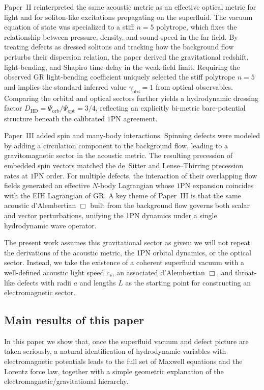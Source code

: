 \documentclass[11pt]{article}
\begin{document}
Paper~II \cite{Norris:Paper2} reinterpreted the same acoustic metric as an effective optical metric for light and for soliton-like excitations propagating on the superfluid.  The vacuum equation of state was specialized to a stiff $n=5$ polytrope, which fixes the relationship between pressure, density, and sound speed in the far field.  By treating defects as dressed solitons and tracking how the background flow perturbs their dispersion relation, the paper derived the gravitational redshift, light-bending, and Shapiro time delay in the weak-field limit.  Requiring the observed GR light-bending coefficient uniquely selected the stiff polytrope $n=5$ and implies the standard inferred value $\gamma_{\mathrm{obs}}=1$ from optical observables.  Comparing the orbital and optical sectors further yields a hydrodynamic dressing factor $D_{\mathrm{HD}}=\Psi_{\mathrm{orb}}/\Psi_{\mathrm{opt}}=3/4$, reflecting an explicitly bi-metric bare-potential structure beneath the calibrated $1$PN agreement.

Paper~III \cite{Norris:Paper3} added spin and many-body interactions.  Spinning defects were modeled by adding a circulation component to the background flow, leading to a gravitomagnetic sector in the acoustic metric.  The resulting precession of embedded spin vectors matched the de~Sitter and Lense--Thirring precession rates at $1$PN order.  For multiple defects, the interaction of their overlapping flow fields generated an effective $N$-body Lagrangian whose $1$PN expansion coincides with the EIH Lagrangian of GR.  A key theme of Paper~III is that the same acoustic d'Alembertian $\Box$ built from the background flow governs both scalar and vector perturbations, unifying the 1PN dynamics under a single hydrodynamic wave operator.

The present work assumes this gravitational sector as given: we will not repeat the derivations of the acoustic metric, the 1PN orbital dynamics, or the optical sector.  Instead, we take the existence of a coherent superfluid vacuum with a well-defined acoustic light speed $c_s$, an associated d'Alembertian $\Box$, and throat-like defects with radii $a$ and lengths $L$ as the starting point for constructing an electromagnetic sector.

\subsection{Main results of this paper}

In this paper we show that, once the superfluid vacuum and defect picture are taken seriously, a natural identification of hydrodynamic variables with electromagnetic potentials leads to the full set of Maxwell equations and the Lorentz force law, together with a simple geometric explanation of the electromagnetic/gravitational hierarchy.
\end{document}
